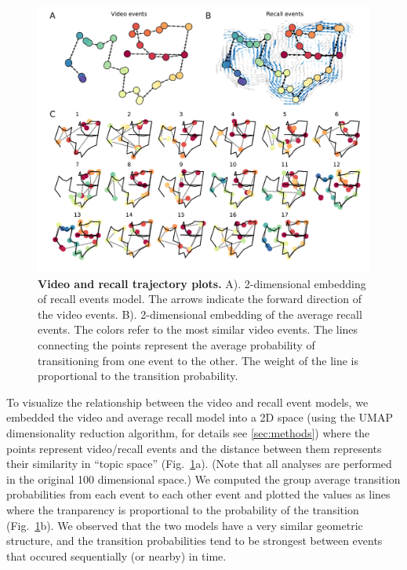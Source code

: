 \documentclass{article}
\begin{document}
{\begin{figure}[t!]
\centering
\includegraphics[width=1\textwidth]{figs/4_trajectory.pdf}
\caption{\small \textbf{Video and recall trajectory plots.} A). 2-dimensional embedding of recall events model. The arrows indicate the forward direction of the video events. B). 2-dimensional embedding of the average recall events.  The colors refer to the most similar video events.  The lines connecting the points represent the average probability of transitioning from one event to the other. The weight of the line is proportional to the transition probability.}
\label{fig:trajectory}
\end{figure}

To visualize the relationship between the video and recall event models, we embedded the video and average recall model into a 2D space (using the UMAP dimensionality reduction algorithm, for details see \ref{sec:methods}) where the points represent video/recall events and the distance between them represents their similarity in ``topic space'' (Fig.~\ref{fig:trajectory}a). (Note that all analyses are performed in the original 100 dimensional space.) We computed the group average transition probabilities from each event to each other event and plotted the values as lines where the tranparency is proportional to the probability of the transition (Fig.~\ref{fig:trajectory}b).  We observed that the two models have a very similar geometric structure, and the transition probabilities tend to be strongest between events that occured sequentially (or nearby) in time.

}
\end{document}

